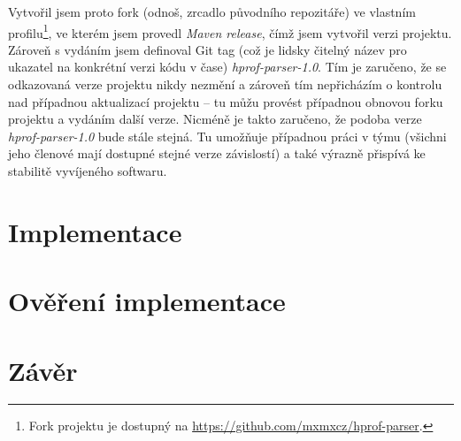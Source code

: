 Vytvořil jsem proto fork (odnoš, zrcadlo původního repozitáře) ve vlastním profilu\footnote{Fork projektu je dostupný na \url{https://github.com/mxmxcz/hprof-parser}.}, ve kterém jsem provedl \textit{Maven release}, čímž jsem vytvořil verzi projektu. Zároveň s vydáním jsem definoval Git tag (což je lidsky čitelný název pro ukazatel na konkrétní verzi kódu v čase) \textit{hprof-parser-1.0}. Tím je zaručeno, že se odkazovaná verze projektu nikdy nezmění a zároveň tím nepřicházím o kontrolu nad případnou aktualizací projektu -- tu můžu provést případnou obnovou forku projektu a vydáním další verze. Nicméně je takto zaručeno, že podoba verze \textit{hprof-parser-1.0} bude stále stejná. Tu umožňuje případnou práci v týmu (všichni jeho členové mají dostupné stejné verze závislostí) a také výrazně přispívá ke stabilitě vyvíjeného softwaru.

\chapter{Implementace}
\chapter{Ověření implementace}
\chapter{Závěr}
